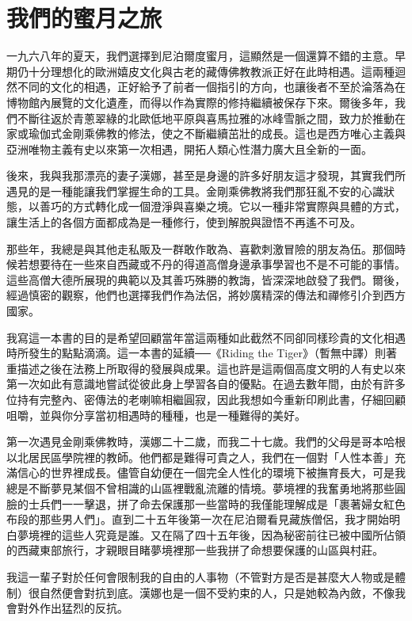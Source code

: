
\chapter{我們的蜜月之旅}


一九六八年的夏天，我們選擇到尼泊爾度蜜月，這顯然是一個還算不錯的主意。早期仍十分理想化的歐洲嬉皮文化與古老的藏傳佛教教派正好在此時相遇。這兩種迴然不同的文化的相遇，正好給予了前者一個指引的方向，也讓後者不至於淪落為在博物館內展覽的文化遺產，而得以作為實際的修持繼續被保存下來。爾後多年，我們不斷往返於青蔥翠綠的北歐低地平原與喜馬拉雅的冰峰雪脈之間，致力於推動在家或瑜伽式金剛乘佛教的修法，使之不斷繼續茁壯的成長。這也是西方唯心主義與亞洲唯物主義有史以來第一次相遇，開拓人類心性潛力廣大且全新的一面。

後來，我與我那漂亮的妻子漢娜，甚至是身邊的許多好朋友這才發現，其實我們所遇見的是一種能讓我們掌握生命的工具。金剛乘佛教將我們那狂亂不安的心識狀態，以善巧的方式轉化成一個澄淨與喜樂之境。它以一種非常實際與具體的方式，讓生活上的各個方面都成為是一種修行，使到解脫與證悟不再遙不可及。

那些年，我總是與其他走私販及一群敢作敢為、喜歡刺激冒險的朋友為伍。那個時候若想要待在一些來自西藏或不丹的得道高僧身邊承事學習也不是不可能的事情。這些高僧大德所展現的典範以及其善巧殊勝的教誨，皆深深地啟發了我們。爾後，經過慎密的觀察，他們也選擇我們作為法侶，將妙廣精深的傳法和禪修引介到西方國家。

我寫這一本書的目的是希望回顧當年當這兩種如此截然不同卻同樣珍貴的文化相遇時所發生的點點滴滴。這一本書的延續──《Riding
the
Tiger》（暫無中譯）則著重描述之後在法務上所取得的發展與成果。這也許是這兩個高度文明的人有史以來第一次如此有意識地嘗試從彼此身上學習各自的優點。在過去數年間，由於有許多位持有完整內、密傳法的老喇嘛相繼圓寂，因此我想如今重新印刷此書，仔細回顧咀嚼，並與你分享當初相遇時的種種，也是一種難得的美好。

第一次遇見金剛乘佛教時，漢娜二十二歲，而我二十七歲。我們的父母是哥本哈根以北居民區學院裡的教師。他們都是難得可貴之人，我們在一個對「人性本善」充滿信心的世界裡成長。儘管自幼便在一個完全人性化的環境下被撫育長大，可是我總是不斷夢見某個不曾相識的山區裡戰亂流離的情境。夢境裡的我奮勇地將那些圓臉的士兵們一一擊退，拼了命去保護那一些當時的我僅能理解成是「裹著婦女紅色布段的那些男人們」。直到二十五年後第一次在尼泊爾看見藏族僧侶，我才開始明白夢境裡的這些人究竟是誰。又在隔了四十五年後，因為秘密前往已被中國所佔領的西藏東部旅行，才親眼目睹夢境裡那一些我拼了命想要保護的山區與村莊。

我這一輩子對於任何會限制我的自由的人事物（不管對方是否是甚麼大人物或是體制）很自然便會對抗到底。漢娜也是一個不受約束的人，只是她較為內斂，不像我會對外作出猛烈的反抗。


